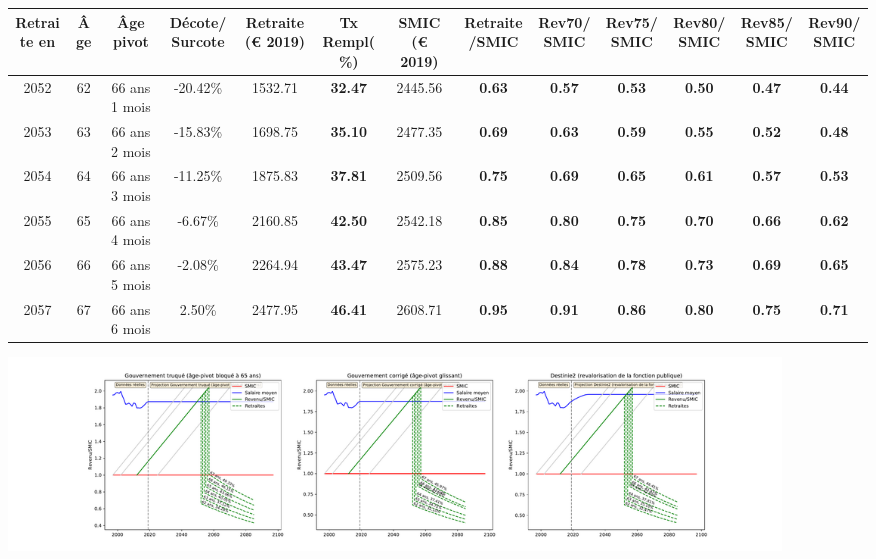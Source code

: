 { \scriptsize \begin{center} 
\begin{tabular}[htb]{|c|c||c|c||c|c||c||c|c|c|c|c|c|} 
\hline 
 Retraite en &  Âge &  Âge pivot &  Décote/Surcote &  Retraite (\euro{} 2019) &  Tx Rempl(\%) &  SMIC (\euro{} 2019) &  Retraite/SMIC &  Rev70/SMIC &  Rev75/SMIC &  Rev80/SMIC &  Rev85/SMIC &  Rev90/SMIC \\ 
\hline \hline 
 2052 &  62 &  66 ans 1 mois &  -20.42\% &  1532.71 &  {\bf 32.47} &  2445.56 &  {\bf {\color{red} 0.63}} &  {\bf {\color{red} 0.57}} &  {\bf {\color{red} 0.53}} &  {\bf {\color{red} 0.50}} &  {\bf {\color{red} 0.47}} &  {\bf {\color{red} 0.44}} \\ 
\hline 
 2053 &  63 &  66 ans 2 mois &  -15.83\% &  1698.75 &  {\bf 35.10} &  2477.35 &  {\bf {\color{red} 0.69}} &  {\bf {\color{red} 0.63}} &  {\bf {\color{red} 0.59}} &  {\bf {\color{red} 0.55}} &  {\bf {\color{red} 0.52}} &  {\bf {\color{red} 0.48}} \\ 
\hline 
 2054 &  64 &  66 ans 3 mois &  -11.25\% &  1875.83 &  {\bf 37.81} &  2509.56 &  {\bf {\color{red} 0.75}} &  {\bf {\color{red} 0.69}} &  {\bf {\color{red} 0.65}} &  {\bf {\color{red} 0.61}} &  {\bf {\color{red} 0.57}} &  {\bf {\color{red} 0.53}} \\ 
\hline 
 2055 &  65 &  66 ans 4 mois &  -6.67\% &  2160.85 &  {\bf 42.50} &  2542.18 &  {\bf {\color{red} 0.85}} &  {\bf {\color{red} 0.80}} &  {\bf {\color{red} 0.75}} &  {\bf {\color{red} 0.70}} &  {\bf {\color{red} 0.66}} &  {\bf {\color{red} 0.62}} \\ 
\hline 
 2056 &  66 &  66 ans 5 mois &  -2.08\% &  2264.94 &  {\bf 43.47} &  2575.23 &  {\bf {\color{red} 0.88}} &  {\bf {\color{red} 0.84}} &  {\bf {\color{red} 0.78}} &  {\bf {\color{red} 0.73}} &  {\bf {\color{red} 0.69}} &  {\bf {\color{red} 0.65}} \\ 
\hline 
 2057 &  67 &  66 ans 6 mois &  2.50\% &  2477.95 &  {\bf 46.41} &  2608.71 &  {\bf {\color{red} 0.95}} &  {\bf {\color{red} 0.91}} &  {\bf {\color{red} 0.86}} &  {\bf {\color{red} 0.80}} &  {\bf {\color{red} 0.75}} &  {\bf {\color{red} 0.71}} \\ 
\hline 
\hline 
\end{tabular} 
\end{center} } 

 \begin{center}\includegraphics[width=0.9\textwidth]{fig/Ascendant12_1990_22_dest_retraite.pdf}\end{center} \label{fig/Ascendant12_1990_22_dest_retraite.pdf} 

